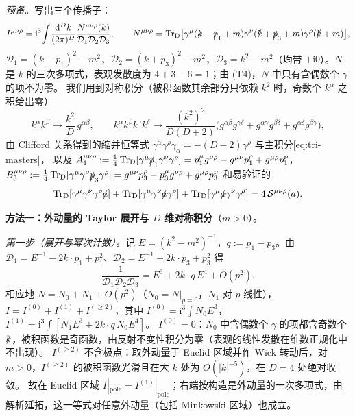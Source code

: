 \documentclass[UTF8,a4paper,11pt,fontset=fandol]{ctexart}
\makeatletter
\theoremstyle{cplain}
\theoremstyle{cdefinition}
\theoremstyle{cremark}
\renewcommand{\proofname}{证明}
\renewenvironment{proof}[1][\proofname]{\par\pushQED{\qed}\normalfont\topsep6\p@\@plus6\p@\relax
  \trivlist\item[\hskip\labelsep\itshape #1\hspace{0.5em}]\ignorespaces}{\popQED\endtrivlist\@endpefalse}
\numberwithin{equation}{section}
\newcommand{\TrD}{\operatorname{Tr}_{\mathrm{D}}}   %
\newcommand{\sla}[1]{\slashed{#1}}                  %
\newcommand{\dd}{\mathrm{d}}                         %
\newcommand{\ii}{\mathrm{i}}                        %
\makeatother
\begin{document}
\begin{proof}[{\cref{prop:triangle}(iv) 的证明}]
\emph{预备。}写出三个传播子：
\begin{equation}\label{eq:tri-I-N}
I^{\mu\nu\rho}=\ii^3\!\int\!\frac{\dd^Dk}{(2\pi)^D}\frac{N^{\mu\nu\rho}(k)}{\mathcal D_1\mathcal D_2\mathcal D_3},\qquad
N^{\mu\nu\rho}=\TrD\bigl[\gamma^\mu(\sla k-\sla p_1+m)\gamma^\nu(\sla k+\sla p_3+m)\gamma^\rho(\sla k+m)\bigr],
\end{equation}
$\mathcal D_1=(k-p_1)^2-m^2$，$\mathcal D_2=(k+p_3)^2-m^2$，$\mathcal D_3=k^2-m^2$（均带 $+\ii0$）。$N$ 是 $k$ 的三次多项式，表观发散度为 $4+3-6=1$；由 (T4)，$N$ 中只有含偶数个 $\gamma$ 的项不为零。
我们用到对称积分（被积函数其余部分只依赖 $k^2$ 时，奇数个 $k^\alpha$ 之积给出零）
\begin{equation}\label{eq:tri-symint}
k^\alpha k^\beta\to\frac{k^2}{D}\,g^{\alpha\beta},\qquad
k^\alpha k^\beta k^\gamma k^\delta\to\frac{(k^2)^2}{D(D+2)}\bigl(g^{\alpha\beta}g^{\gamma\delta}+g^{\alpha\gamma}g^{\beta\delta}+g^{\alpha\delta}g^{\beta\gamma}\bigr),
\end{equation}
由 Clifford 关系得到的缩并恒等式 $\gamma^\alpha\gamma^\rho\gamma_\alpha=-(D-2)\gamma^\rho$ 与主积分\cref{eq:tri-masters}，
以及 $A_1^{\mu\nu\rho}:=\frac14\TrD[\gamma^\mu\sla p_1\gamma^\nu\gamma^\rho]=p_1^\mu g^{\nu\rho}-g^{\mu\nu}p_1^\rho+g^{\mu\rho}p_1^\nu$，
$B_3^{\mu\nu\rho}:=\frac14\TrD[\gamma^\mu\gamma^\nu\sla p_3\gamma^\rho]=g^{\mu\nu}p_3^\rho-p_3^\mu g^{\nu\rho}+g^{\mu\rho}p_3^\nu$ 和易验证的
\begin{equation}\label{eq:tri-4gamma}
\TrD[\gamma^\mu\gamma^\nu\gamma^\rho\sla a]+\TrD[\gamma^\mu\gamma^\nu\sla a\gamma^\rho]+\TrD[\gamma^\mu\sla a\gamma^\nu\gamma^\rho]=4\,\mathcal S^{\mu\nu\rho}(a).
\end{equation}

\smallskip\noindent\textbf{\boldmath 方法一：外动量的 Taylor 展开与 $D$ 维对称积分}（$m>0$）。

\emph{第一步（展开与幂次计数）。}记 $E=(k^2-m^2)^{-1}$，$q:=p_1-p_3$。由 $\mathcal D_1=E^{-1}-2k\cdot p_1+p_1^2$、$\mathcal D_2=E^{-1}+2k\cdot p_3+p_3^2$ 得
\begin{equation}\label{eq:tri-taylor}
\frac{1}{\mathcal D_1\mathcal D_2\mathcal D_3}=E^3+2k\cdot q\,E^4+O(p^2).
\end{equation}
相应地 $N=N_0+N_1+O(p^2)$（$N_0=N|_{p=0}$，$N_1$ 对 $p$ 线性），$I=I^{(0)}+I^{(1)}+I^{(\ge2)}$，其中
$I^{(0)}=\ii^3\!\int\!N_0E^3$，$I^{(1)}=\ii^3\!\int\![N_1E^3+2k\cdot q\,N_0E^4]$。
$I^{(0)}=0$：$N_0$ 中含偶数个 $\gamma$ 的项都含奇数个 $\sla k$，被积函数是奇函数，由反射不变性积分为零（表观的线性发散在维数正规化中不出现）。
$I^{(\ge2)}$ 不含极点：取外动量于 Euclid 区域并作 Wick 转动后，对 $m>0$，$I^{(\ge2)}$ 的被积函数光滑且在大 $k$ 处为 $O(|k|^{-5})$，在 $D=4$ 处绝对收敛。
故在 Euclid 区域 $I|_{\mathrm{pole}}=I^{(1)}|_{\mathrm{pole}}$；右端按构造是外动量的一次多项式，由解析延拓，这一等式对任意外动量（包括 Minkowski 区域）也成立。


\end{proof}
\end{document}
